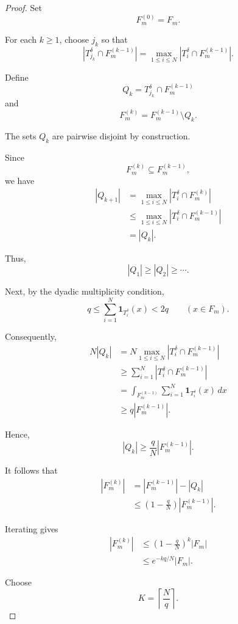 \documentclass[11pt, letterpaper]{nyjm}
\begin{document}
\begin{proof}
	
	Set
	\[
	F_m^{(0)}=F_m.
	\]
	
	For each $k\geq1$, choose $j_k$ so that
	\[
	|T_{j_k}^\delta\cap F_m^{(k-1)}|
	=
	\max_{1\leq i\leq N}
	|T_i^\delta\cap F_m^{(k-1)}|.
	\]
	
	Define
	\[
	Q_k=T_{j_k}^\delta\cap F_m^{(k-1)}
	\]
	and
	\[
	F_m^{(k)}
	=
	F_m^{(k-1)}\setminus Q_k.
	\]
	
	The sets $Q_k$ are pairwise disjoint
	by construction.
	
	Since
	\[
	F_m^{(k)}\subseteq F_m^{(k-1)},
	\]
	we have
	\[
	\begin{aligned}
		|Q_{k+1}|
		&=
		\max_{1\leq i\leq N}
		|T_i^\delta\cap F_m^{(k)}|\\
		&\leq
		\max_{1\leq i\leq N}
		|T_i^\delta\cap F_m^{(k-1)}|\\
		&=|Q_k|.
	\end{aligned}
	\]
	
	Thus,
	\[
	|Q_1|\geq|Q_2|\geq\cdots.
	\]
	
	Next, by the dyadic multiplicity condition,
	\[
	q\leq
	\sum_{i=1}^N\mathbf{1}_{T_i^\delta}(x)
	<2q
	\qquad (x\in F_m).
	\]
	
	Consequently,
	\[
	\begin{aligned}
		N|Q_k|
		&=
		N\max_{1\leq i\leq N}
		|T_i^\delta\cap F_m^{(k-1)}|\\
		&\geq
		\sum_{i=1}^N
		|T_i^\delta\cap F_m^{(k-1)}|\\
		&=
		\int_{F_m^{(k-1)}}
		\sum_{i=1}^N
		\mathbf{1}_{T_i^\delta}(x)\,dx\\
		&\geq q|F_m^{(k-1)}|.
	\end{aligned}
	\]
	
	Hence,
	\[
	\boxed{
		|Q_k|\geq
		\frac qN|F_m^{(k-1)}|.
	}
	\]
	
	It follows that
	\[
	\begin{aligned}
		|F_m^{(k)}|
		&=
		|F_m^{(k-1)}|-|Q_k|\\
		&\leq
		\left(1-\frac qN\right)
		|F_m^{(k-1)}|.
	\end{aligned}
	\]
	
	Iterating gives
	\[
	\begin{aligned}
		|F_m^{(k)}|
		&\leq
		\left(1-\frac qN\right)^k|F_m|\\
		&\leq e^{-kq/N}|F_m|.
	\end{aligned}
	\]
	
	Choose
	\[
	K=\left\lceil\frac Nq\right\rceil.
	\]
	

\end{proof}
\end{document}
